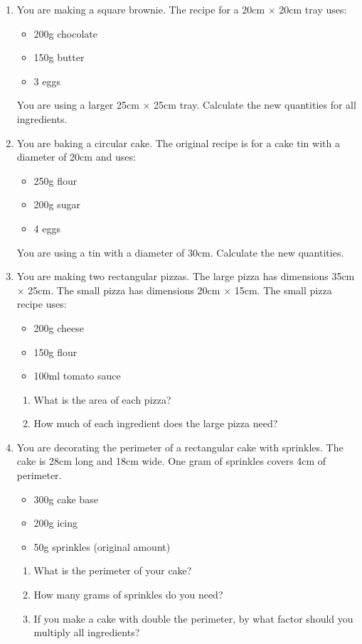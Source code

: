 \documentclass[12pt]{article}
\begin{document}
\begin{enumerate}[resume]
\item You are making a square brownie. The recipe for a 20cm × 20cm tray uses:
    \begin{itemize}
    \item 200g chocolate
    \item 150g butter
    \item 3 eggs
    \end{itemize}
    You are using a larger 25cm × 25cm tray. Calculate the new quantities for all ingredients.

\item You are baking a circular cake. The original recipe is for a cake tin with a diameter of 20cm and uses:
    \begin{itemize}
    \item 250g flour
    \item 200g sugar
    \item 4 eggs
    \end{itemize}
    You are using a tin with a diameter of 30cm. Calculate the new quantities.

\item You are making two rectangular pizzas. The large pizza has dimensions 35cm × 25cm. The small pizza has dimensions 20cm × 15cm. The small pizza recipe uses:
    \begin{itemize}
    \item 200g cheese
    \item 150g flour
    \item 100ml tomato sauce
    \end{itemize}
    \begin{enumerate}
    \item What is the area of each pizza?
    \item How much of each ingredient does the large pizza need?
    \end{enumerate}

\newpage{}

\item You are decorating the perimeter of a rectangular cake with sprinkles. The cake is 28cm long and 18cm wide. One gram of sprinkles covers 4cm of perimeter.
    \begin{itemize}
    \item 300g cake base
    \item 200g icing
    \item 50g sprinkles (original amount)
    \end{itemize}
    \begin{enumerate}
    \item What is the perimeter of your cake?
    \item How many grams of sprinkles do you need?
    \item If you make a cake with double the perimeter, by what factor should you multiply all ingredients?
    \end{enumerate}


\end{enumerate}
\end{document}
